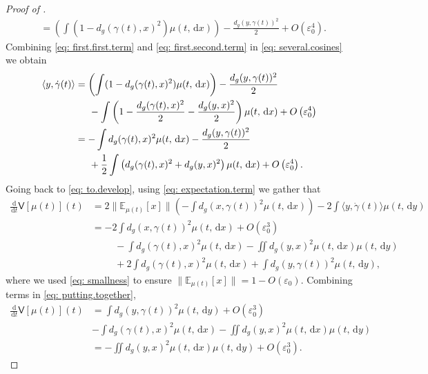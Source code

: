 \documentclass[a4paper,11pt]{article}
\theoremstyle{plain}
\newcommand{\diff}{\, \mathrm{d}}
\numberwithin{equation}{section}
\begin{document}
\begin{proof}[Proof of ]
\begin{align}
    &=\left(\int (1-d_g(\gamma(t),x)^2)\mu(t,\diff x)\right)-\frac{d_g(y,\gamma(t))^2}{2}+O\left(\varepsilon_0^4\right).\label{eq: first.second.term}
\end{align}
Combining \eqref{eq: first.first.term} and \eqref{eq: first.second.term} in \eqref{eq: several.cosines} we obtain
\begin{align*}
    \langle y,\dot{\gamma}(t)\rangle &=\left(\int (1-d_g(\gamma(t),x)^2)\mu(t,\diff x)\right)-\frac{d_g(y,\gamma(t))^2}{2}\nonumber\\
    &\hspace{0.5cm}-\int \left(1-\frac{d_g(\gamma(t),x)^2}{2}-\frac{d_g(y,x)^2}{2}\right)\mu(t,\diff x)+O\left(\varepsilon_0^4\right)\nonumber\\
    &=-\int d_g(\gamma(t),x)^2\mu(t,\diff x)-\frac{d_g(y,\gamma(t))^2}{2}\nonumber\\
    &\hspace{0.5cm}+\frac{1}{2}\int \left(d_g(\gamma(t),x)^2+d_g(y,x)^2\right)\mu(t,\diff x)+O\left(\varepsilon_0^4\right).
\end{align*}
Going back to \eqref{eq: to.develop}, using \eqref{eq: expectation.term} we gather that
\begin{align}
    \frac{\diff}{\diff t} \mathsf{V}[\mu(t)](t)&=2\|\mathbb{E}_{\mu(t)}[x]\|\left(-\int d_g(x,\gamma(t))^2\mu(t,\diff x)\right)-2\int \langle y,\dot{\gamma}(t)\rangle \mu(t,\diff y)\nonumber\\
    &=-2\int d_g(x,\gamma(t))^2\mu(t,\diff x)+O\left(\varepsilon_0^3\right)\nonumber\\
    &\hspace{1cm} - \int d_g(\gamma(t),x)^2\mu(t,\diff x)-\iint d_g(y,x)^2\mu(t,\diff x)\mu(t,\diff y)\nonumber\\
    &\hspace{1cm} +2\int d_g(\gamma(t),x)^2\mu(t,\diff x)+\int d_g(y,\gamma(t))^2\mu(t,\diff y),\label{eq: putting.together}
\end{align}
where we used \eqref{eq: smallness} to ensure $\|\mathbb{E}_{\mu(t)}[x]\|=1-O(\varepsilon_0)$. 
Combining terms in \eqref{eq: putting.together},
\begin{align*}
    \frac{\diff}{\diff t} \mathsf{V}[\mu(t)](t)&=\int d_g(y,\gamma(t))^2\mu(t,\diff y)+O\left(\varepsilon_0^3\right)\nonumber\\
    &-\int d_g(\gamma(t),x)^2\mu(t,\diff x)-\iint d_g(y,x)^2\mu(t,\diff x)\mu(t,\diff y)\nonumber\\
    &=-\iint d_g(y,x)^2\mu(t,\diff x)\mu(t,\diff y)+O\left(\varepsilon_0^3\right).

\end{align*}
\end{proof}
\end{document}
